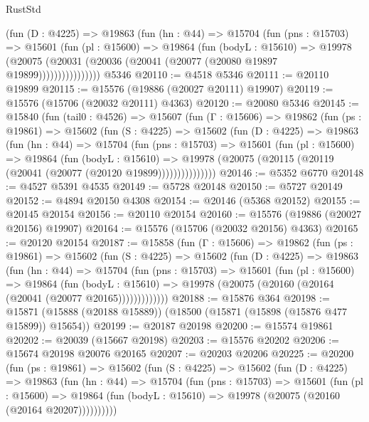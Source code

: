 \begin{lexlean}{RustStd}
\begin{coremodule}
              (fun (D : @4225) =>
              @19863
                (fun (hn : @44) =>
                @15704
                  (fun (pns : @15703) =>
                  @15601
                    (fun (pl : @15600) =>
                    @19864
                      (fun (bodyL : @15610) =>
                      @19978
                        (@20075
                          (@20031 (@20036 (@20041 (@20077 (@20080 @19897 @19899))))))))))))))))
    @5346
@20110 := @4518 @5346
@20111 := @20110 @19899
@20115 := @15576 (@19886 (@20027 @20111) @19907)
@20119 := @15576 (@15706 (@20032 @20111) @4363)
@20120 := @20080 @5346
@20145 := @15840
    (fun (tail0 : @4526) =>
    @15607
      (fun (Γ : @15606) =>
      @19862
        (fun (ps : @19861) =>
        @15602
          (fun (S : @4225) =>
          @15602
            (fun (D : @4225) =>
            @19863
              (fun (hn : @44) =>
              @15704
                (fun (pns : @15703) =>
                @15601
                  (fun (pl : @15600) =>
                  @19864
                    (fun (bodyL : @15610) =>
                    @19978 (@20075 (@20115 (@20119 (@20041 (@20077 (@20120 @19899)))))))))))))))
@20146 := @5352 @6770
@20148 := @4527 @5391 @4535
@20149 := @5728 @20148
@20150 := @5727 @20149
@20152 := @4894 @20150 @4308
@20154 := @20146 (@5368 @20152)
@20155 := @20145 @20154
@20156 := @20110 @20154
@20160 := @15576 (@19886 (@20027 @20156) @19907)
@20164 := @15576 (@15706 (@20032 @20156) @4363)
@20165 := @20120 @20154
@20187 := @15858
    (fun (Γ : @15606) =>
    @19862
      (fun (ps : @19861) =>
      @15602
        (fun (S : @4225) =>
        @15602
          (fun (D : @4225) =>
          @19863
            (fun (hn : @44) =>
            @15704
              (fun (pns : @15703) =>
              @15601
                (fun (pl : @15600) =>
                @19864
                  (fun (bodyL : @15610) =>
                  @19978 (@20075 (@20160 (@20164 (@20041 (@20077 @20165)))))))))))))
@20188 := @15876 @364
@20198 := @15871 (@15888 (@20188 @15889)) (@18500 (@15871 (@15898 (@15876 @477 @15899)) @15654))
@20199 := @20187 @20198
@20200 := @15574 @19861
@20202 := @20039 (@15667 @20198)
@20203 := @15576 @20202
@20206 := @15674 @20198 @20076 @20165
@20207 := @20203 @20206
@20225 := @20200
    (fun (ps : @19861) =>
    @15602
      (fun (S : @4225) =>
      @15602
        (fun (D : @4225) =>
        @19863
          (fun (hn : @44) =>
          @15704
            (fun (pns : @15703) =>
            @15601
              (fun (pl : @15600) =>
              @19864 (fun (bodyL : @15610) => @19978 (@20075 (@20160 (@20164 @20207))))))))))

\end{coremodule}
\end{lexlean}
